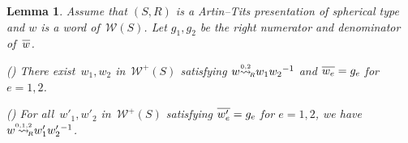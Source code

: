 \documentclass{amsart}
\numberwithin{equation}{section}
\theoremstyle{plain}
\newtheorem{lemm}[prop]{Lemma}
\theoremstyle{definition}
\newcounter{ITEM}
\begin{document}
\begin{lemm}\cite{Dff}
\label{L:Rev}
Assume that $({S}, {R})$ is a Artin--Tits presentation of spherical type and ${w}$ is a word of~${\mathcal{W}({S})}$. Let ${g}_1, {g}_2$ be the right numerator and denominator of~${\overline{\vrule width0pt height5pt{w}}}$.

{\setcounter{ITEM}{1}\leavevmode\hbox{\rm()}} There exist~${w}_1, {w}_2$ in~${\mathcal{W}^{\scriptscriptstyle+}\!({S})}$ satisfying ${w} {{\mathrel{\overset{\scriptscriptstyle 0,2}{\rightsquigarrow}}}_{\hspace{-0.4ex}{\scriptscriptstyle R}}} {w}_1 {w}_2{^{-1}}$ and ${\overline{\vrule width0pt height5pt{{w}_{e}}}} = {g}_{e}$ for ${e} = 1,2$.

{\setcounter{ITEM}{2}\leavevmode\hbox{\rm()}} For all~${w}'_1, {w}'_2$ in~${\mathcal{W}^{\scriptscriptstyle+}\!({S})}$ satisfying ${\overline{\vrule width0pt height5pt{{w}'_{e}}}} = {g}_{e}$ for ${e} = 1, 2$, we have ${w} {\mathrel{{\mathrel{\overset{\scriptscriptstyle 0,1,2}{\rightsquigarrow}}}_{\hspace{-0.9ex}{\scriptscriptstyle R}}}} {w}'_1 {w}'_2{}{^{-1}}$.
\end{lemm}
\end{document}
